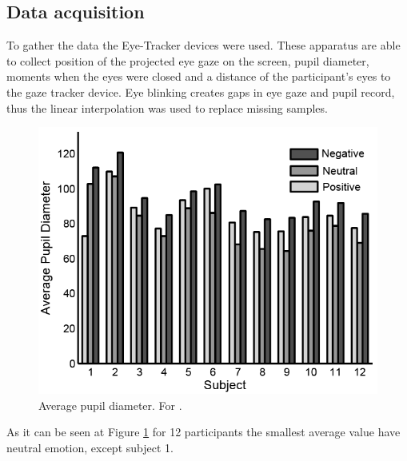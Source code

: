 \documentclass[10pt,journal,compsoc,twoside]{IEEEtran}
\newcommand{\Ref}[2]{#2 \ref{#1}}
\begin{document}
\subsection{Data acquisition}
To gather the data the Eye-Tracker devices were used. These apparatus are able to collect position of the projected eye gaze on the screen, pupil diameter, moments when the eyes were closed and a distance of the participant's eyes to the gaze tracker device. Eye blinking creates gaps in eye gaze and pupil record, thus the linear interpolation was used to replace missing samples.
\begin{figure}[ht]
	\centering
	\includegraphics[width=1.0\linewidth]{pupilDiameter1}
	\caption{Average pupil diameter. For \cite{WeiLongBoNanBaoLiang2014}.}
	\label{fig:pupilSize1}
\end{figure}
\newline
As it can be seen at \Ref{fig:pupilSize1}{Figure} for 12 participants the smallest average value have neutral emotion, except subject 1.
\end{document}

